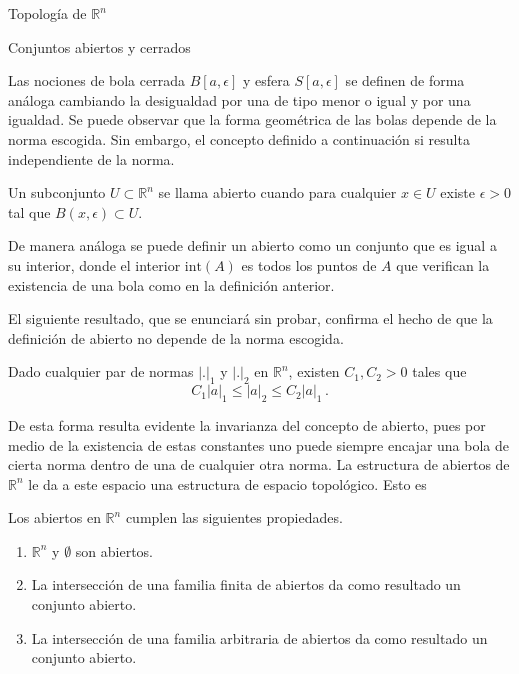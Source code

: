 \begin{chapter}{Topología de $\mathbb{R}^n$}
\begin{section}{Conjuntos abiertos y cerrados}
\begin{defn}
\end{defn}

Las nociones de bola cerrada $B[a, \epsilon]$ y esfera $S[a, \epsilon]$ se definen de forma análoga cambiando la desigualdad por una de tipo menor o igual y por una igualdad. Se puede observar que la forma geométrica de las bolas depende de la norma escogida. Sin embargo, el concepto definido a continuación si resulta independiente de la norma.

\begin{defn}

Un subconjunto $U \subset \mathbb{R}^n$ se llama abierto cuando para cualquier $x \in U$ existe $\epsilon > 0$ tal que $B(x, \epsilon) \subset U$.

\end{defn}

De manera análoga se puede definir un abierto como un conjunto que es igual a su interior, donde el interior $\text{int}(A)$ es todos los puntos de $A$ que verifican la existencia de una bola como en la definición anterior.

El siguiente resultado, que se enunciará sin probar, confirma el hecho de que la definición de abierto no depende de la norma escogida.

\begin{them}

Dado cualquier par de normas $|.|_1$ y $|.|_2$ en $\mathbb{R}^n$, existen $C_1, C_2 > 0$ tales que
$$C_1|a|_1 \leq |a|_2 \leq C_2|a|_1\,.$$

\end{them}  

De esta forma resulta evidente la invarianza del concepto de abierto, pues por medio de la existencia de estas constantes uno puede siempre encajar una bola de cierta norma dentro de una de cualquier otra norma. La estructura de abiertos de $\mathbb{R}^n$ le da a este espacio una estructura de espacio topológico. Esto es

\begin{them}

Los abiertos en $\mathbb{R}^n$ cumplen las siguientes propiedades.

\begin{enumerate}
    \item $\mathbb{R}^n$ y $\emptyset$ son abiertos.
    \item La intersección de una familia finita de abiertos da como resultado un conjunto abierto.
    \item La intersección de una familia arbitraria de abiertos da como resultado un conjunto abierto.
\end{enumerate}


\end{them}
\end{section}
\end{chapter}

